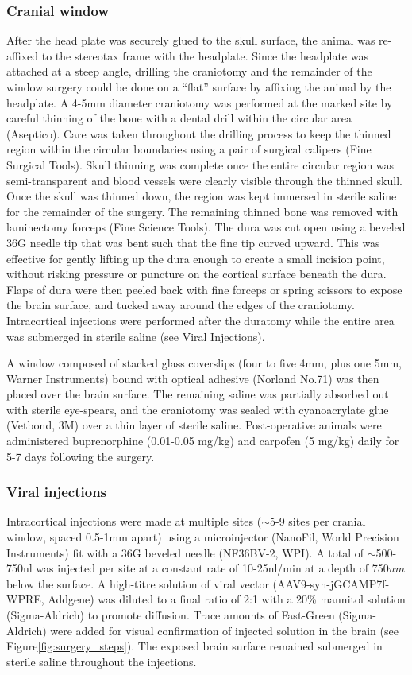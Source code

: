 \subsubsection{Cranial window}
After the head plate was securely glued to the skull surface, the animal was re-affixed to the stereotax frame with the headplate. Since the headplate was attached at a steep angle, drilling the craniotomy and the remainder of the window surgery could be done on a ``flat'' surface by affixing the animal by the headplate. A 4-5mm diameter craniotomy was performed at the marked site by careful thinning of the bone with a dental drill within the circular area (Aseptico). Care was taken throughout the drilling process to keep the thinned region within the circular boundaries using a pair of surgical calipers (Fine Surgical Tools). Skull thinning was complete once the entire circular region was semi-transparent and blood vessels were clearly visible through the thinned skull. Once the skull was thinned down, the region was kept immersed in sterile saline for the remainder of the surgery. The remaining thinned bone was removed with laminectomy forceps (Fine Science Tools). The dura was cut open using a beveled 36G needle tip that was bent such that the fine tip curved upward. This was effective for gently lifting up the dura enough to create a small incision point, without risking pressure or puncture on the cortical surface beneath the dura. Flaps of dura were then peeled back with fine forceps or spring scissors to expose the brain surface, and tucked away around the edges of the craniotomy. Intracortical injections were performed after the duratomy while the entire area was submerged in sterile saline (see Viral Injections).

A window composed of stacked glass coverslips (four to five 4mm, plus one 5mm, Warner Instruments) bound with optical adhesive (Norland No.71) was then placed over the brain surface. The remaining saline was partially absorbed out with sterile eye-spears, and the craniotomy was sealed with cyanoacrylate glue (Vetbond, 3M) over a thin layer of sterile saline. Post-operative animals were administered buprenorphine (0.01-0.05 mg/kg) and carpofen (5 mg/kg) daily for 5-7 days following the surgery.

\subsubsection{Viral injections}
Intracortical injections were made at multiple sites ($\sim$5-9 sites per cranial window, spaced 0.5-1mm apart) using a microinjector (NanoFil, World Precision Instruments) fit with a 36G beveled needle (NF36BV-2, WPI). A total of $\sim$500-750nl was injected per site at a constant rate of 10-25nl/min at a depth of 750$um$ below the surface. A high-titre solution of viral vector (AAV9-syn-jGCAMP7f-WPRE, Addgene) was diluted to a final ratio of 2:1 with a 20\% mannitol solution (Sigma-Aldrich) to promote diffusion. Trace amounts of Fast-Green (Sigma-Aldrich) were added for visual confirmation of injected solution in the brain (see Figure\ref{fig:surgery_steps}). The exposed brain surface remained submerged in sterile saline throughout the injections.

